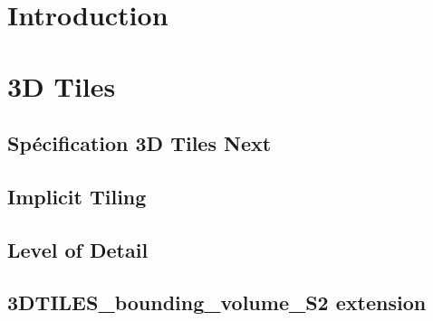 \documentclass[
    TIC, %
    il, %
]{heig-tb}
\begin{document}
\maketitle
\frontmatter
\clearemptydoublepage

\preamble
\authentification

\begin{abstract}
    
\end{abstract}

\clearemptydoublepage
{
    \tableofcontents
    \let\cleardoublepage\clearpage
    \listoffigures
    \let\cleardoublepage\clearpage
}

\printnomenclature
\clearemptydoublepage
{}

\mainmatter


\chapter{Introduction}


\chapter{3D Tiles}

\section{Spécification 3D Tiles Next}
\label{sec:3d-tiles-next}


\section{Implicit Tiling}
\label{sec:implicit-tiling}


\section{Level of Detail}
\label{sec:lod}


\section{3DTILES\_bounding\_volume\_S2 extension}
\label{sec:3DTILES_bv_S2}

\end{document}
